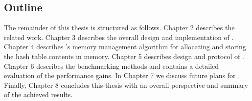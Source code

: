 \subsection{Outline}

The remainder of this thesis is structured as follows. Chapter 2 describes the related work. Chapter 3 
describes the overall design and implementation of \cphash{}. Chapter 4 describes \cphash{}'s memory management 
algorithm for allocating and storing the hash table contents in memory. Chapter 5 describes design and protocol of \cpserver{}.
Chapter 6 describes the benchmarking methods and contains a detailed evaluation of the performance gains. In Chapter 7 we discuss future plans for \cphash{}. 
Finally, Chapter 8 concludes this thesis with an overall perspective and summary of the achieved results. 

